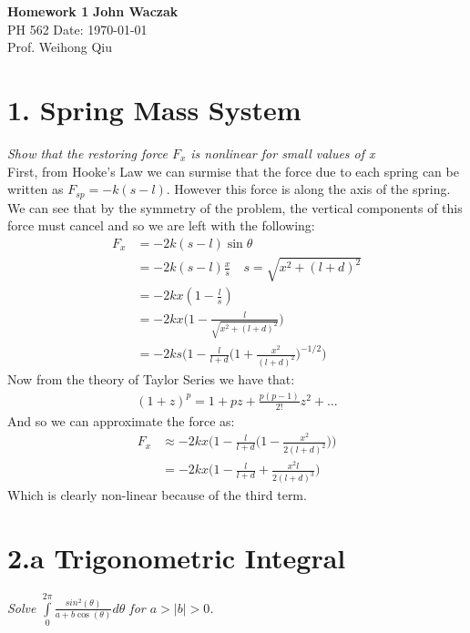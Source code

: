 \documentclass[a4paper, 11pt]{article}
\begin{document}
\noindent
\large\textbf{Homework 1} \hfill \textbf{John Waczak} \\
\normalsize PH 562 \hfill  Date: \today \\
Prof. Weihong Qiu  \\


\section*{1. Spring Mass System}
\textit{Show that the restoring force $F_x$ is nonlinear for small values of x}\\

\noindent First, from Hooke's Law we can surmise that the force due to each spring can be written as $F_{sp} = -k(s-l)$. However this force is along the axis of the spring. We can see that by the symmetry of the problem, the vertical components of this force must cancel and so we are left with the following: 
	\begin{align*}
		F_x &= -2k(s-l)\sin{\theta} \\ 
		&= -2k(s-l)\frac{x}{s} \quad s = \sqrt{x^2+(l+d)^2} \\ 
		&= -2kx(1-\frac{l}{s}) \\ 
		&= -2kx\Bigg(1-\frac{l}{\sqrt{x^2+(l+d)^2}}\Bigg) \\ 
		&= -2ks\Bigg( 1-\frac{l}{l+d}\Bigg(1+\frac{x^2}{(l+d)^2}\Bigg)^{-1/2}\Bigg) 
	\end{align*}
Now from the theory of Taylor Series we have that: 
	\begin{align*}
		(1+z)^p = 1 +pz +\frac{p(p-1)}{2!}z^2 + ... 
	\end{align*}
And so we can approximate the force as: 
	\begin{align*}
		F_x &\approx -2kx \Bigg(  1-\frac{l}{l+d} \Bigg(1 - \frac{x^2}{2(l+d)^2} \Bigg) \Bigg) \\
		&= -2kx \Bigg( 1 - \frac{l}{l+d} + \frac{x^2l}{2(l+d)^3}\Bigg) 
	\end{align*}
Which is clearly non-linear because of the third term. \\ 


\section*{2.a Trigonometric Integral}
\textit{Solve $\int\limits_0^{2\pi} \frac{sin^2(\theta)}{a+b\cos(\theta)}d\theta$  for $a>|b|>0$.} \\ 
\end{document}
